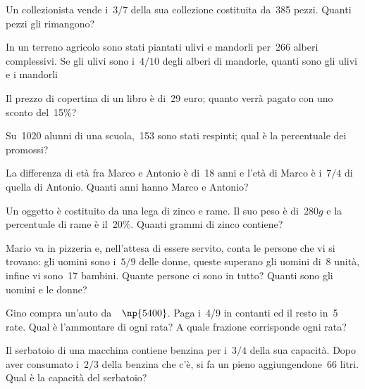 \begin{multicols}{2}
\begin{esercizio}[\Ast]
\end{esercizio}

\begin{esercizio}[\Ast]
 Un collezionista vende i~$3/7$ della sua collezione costituita da~385
pezzi. Quanti pezzi gli rimangono?
\end{esercizio}

\begin{esercizio}[\Ast]
 In un terreno agricolo sono stati piantati ulivi e mandorli per~266
alberi complessivi. Se gli ulivi sono i~$4/10$ degli alberi di mandorle,
quanti sono gli ulivi e i mandorli
\end{esercizio}

\begin{esercizio}[\Ast]
Il prezzo di copertina di un libro è di~29 euro; quanto verrà
pagato con uno sconto del~15\%?
\end{esercizio}

\begin{esercizio}[\Ast]
Su~1020 alunni di una scuola,~153 sono stati respinti; qual è la
percentuale dei promossi?
\end{esercizio}

\begin{esercizio}[\Ast]
 La differenza di età fra Marco e Antonio è di~18 anni e
l'età di Marco è i~$7/4$ di quella di Antonio. Quanti
anni hanno Marco e Antonio?
\end{esercizio}

\begin{esercizio}
 Un oggetto è costituito da una lega di zinco e rame. Il suo peso
è di~$280\unit{g}$ e la percentuale di rame è il~20\%. Quanti grammi di zinco
contiene?
\end{esercizio}

\begin{esercizio}[\Ast]
 Mario va in pizzeria e, nell'attesa di essere
servito, conta le persone che vi si trovano: gli uomini sono i~$5/9$
delle donne, queste superano gli uomini di~8 unità, infine vi sono~17
bambini. Quante persone ci sono in tutto? Quanti sono gli uomini e le
donne?
\end{esercizio}

\begin{esercizio}[\Ast]
 Gino compra un'auto da~\officialeuro~$\np{5400}$. Paga i~4/9 in contanti ed il resto
in~5 rate. Qual è l'ammontare di ogni rata? A quale
frazione corrisponde ogni rata?
\end{esercizio}

\begin{esercizio}[\Ast]
 Il serbatoio di una macchina contiene benzina per i~$3/4$ della sua
capacità. Dopo aver consumato i~$2/3$ della benzina che
c'è, si fa un pieno aggiungendone~66 litri. Qual è
la capacità del serbatoio?
\end{esercizio}


\end{multicols}
